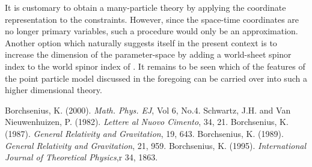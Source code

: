 \documentclass[a4paper,a4paper]{article}
\begin{document}
It is customary to obtain a many-particle theory by applying the coordinate
representation to the constraints. However, since the space-time coordinates are
no longer primary variables, such a procedure would only be an approximation.
Another option which naturally suggests itself in the present context is to
increase the dimension of the parameter-space by adding a world-sheet spinor
index to the world spinor index of \myHighlight{$\psi $}\coordHE{}. It remains to be seen which of the
features of the point particle model discussed in the foregoing can be
carried over into such a higher dimensional theory.        
\begin{thebibliography}{99}
Borchsenius, K. (2000). \emph{Math. Phys. EJ}, Vol 6, No.4.
Schwartz, J.H. and Van
Nieuwenhuizen, P. (1982). \emph{Lettere al Nuovo
Cimento}, 34, 21. 
Borchsenius, K. (1987).
\emph{General Relativity and Gravitation}, 19, 643.
Borchsenius, K. (1989).
\emph{General Relativity and Gravitation}, 21, 959.
Borchsenius, K. (1995).
\emph{International Journal of Theoretical Physics},r
34, 1863. 

\end{thebibliography}
\end{document}
